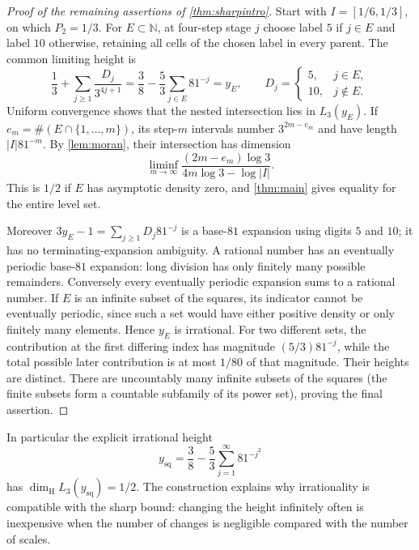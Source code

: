 \documentclass[11pt]{article}
\theoremstyle{definition}
\theoremstyle{remark}
\newcommand{\N}{\mathbb N}
\newcommand{\dimH}{\dim_{\mathrm H}}
\newcommand{\card}{\#}
\begin{document}
\begin{proof}[Proof of the remaining assertions of \cref{thm:sharpintro}]
Start with $I=[1/6,1/3]$, on which $P_2=1/3$.
For $E\subset\N$, at four-step stage $j$ choose label $5$ if $j\in E$
and label $10$ otherwise, retaining all cells of the chosen label in
every parent. The common limiting height is
\[
 \frac13+\sum_{j\ge1}\frac{D_j}{3^{4j+1}}
 =\frac38-\frac53\sum_{j\in E}81^{-j}=y_E,
 \qquad D_j=\begin{cases}5,&j\in E,\\10,&j\notin E.\end{cases}
\]
Uniform convergence shows that the nested intersection lies in $L_3(y_E)$.
If $e_m=\card(E\cap\{1,\ldots,m\})$, its step-$m$ intervals number
$3^{2m-e_m}$ and have length $|I|81^{-m}$.
By \cref{lem:moran}, their intersection has dimension
\[
 \liminf_{m\to\infty}\frac{(2m-e_m)\log3}{4m\log3-\log|I|}.
\]
This is $1/2$ if $E$ has asymptotic density zero, and \cref{thm:main}
gives equality for the entire level set.

Moreover $3y_E-1=\sum_{j\ge1}D_j81^{-j}$ is a base-$81$ expansion
using digits $5$ and $10$; it has no terminating-expansion ambiguity.
A rational number has an eventually periodic base-$81$ expansion:
long division has only finitely many possible remainders. Conversely
every eventually periodic expansion sums to a rational number.
If $E$ is an infinite subset of the squares, its indicator cannot be
eventually periodic, since such a set would have either positive density
or only finitely many elements. Hence $y_E$ is irrational.
For two different sets, the contribution at the first differing index
has magnitude $(5/3)81^{-j}$, while the total possible later contribution
is at most $1/80$ of that magnitude. Their heights are distinct.
There are uncountably many infinite subsets of the squares (the finite
subsets form a countable subfamily of its power set), proving the final
assertion.
\end{proof}

In particular the explicit irrational height
\[
 y_{\mathrm{sq}}=\frac38-\frac53\sum_{j=1}^{\infty}81^{-j^2}
\]
has $\dimH L_3(y_{\mathrm{sq}})=1/2$.
The construction explains why irrationality is compatible with the sharp
bound: changing the height infinitely often is inexpensive when the
number of changes is negligible compared with the number of scales.
\end{document}
